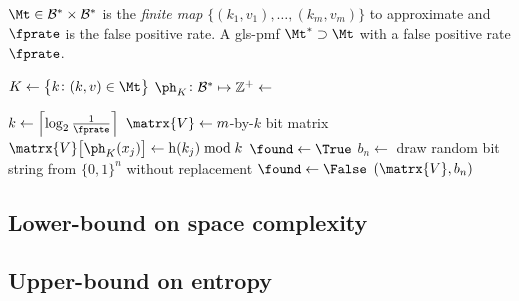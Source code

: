 \documentclass[ ../main.tex]{subfiles}
\begin{document}
\begin{algorithm}[h]
    \caption{Theoretical implementation of \protect\MakeApproxMap}
    \label{alg:shmap}
    \KwIn
    {
        $\Mt \in \mathcal{B}^* \times \mathcal{B}^*$ is the \emph{finite map} $\{(k_1,v_1),\ldots,(k_m,v_m)\}$ to approximate and $\fprate$ is the false positive rate.
    }
    \KwOut
    {
        A \gls{gls-pmf} $\Mt^* \supset \Mt$ with a false positive rate $\fprate$.
    }
    \func{\MakeApproxMap{$\Mt$, $\fprate$}}
    {
        $K \gets \left\{k \colon (k,v) \in \Mt\right\}$\;
        $\ph_{K} \colon \mathcal{B}^* \mapsto \mathbb{Z}^+ \gets$ \;

        $k \gets \left\lceil \log_2 \frac{1}{\fprate} \right\rceil$\;
        $\matrx{V} \gets m$-by-$k$ bit matrix\;
        {
            $\matrx{V}\!\left[\ph_{K}(x_j)\right] \gets \operatorname{h}(k_j) \bmod k$\;
        }
        {
            $\found \gets \True$\;
            {
                $b_n \gets$ draw random bit string from $\{0,1\}^n$ without replacement\;
                {
                    {
                        \label{line:selfterm}
                        $\found \gets \False$\;
                        \Break\;
                    }
                }
                {
                    \Break\;
                }
            }
            \If{\found}
            {
                \Return $(\matrx{V},b_n)$\;
            }
        }
    }
\end{algorithm}


\subsection{Lower-bound on space complexity}

\subsection{Upper-bound on entropy}
\end{document}
